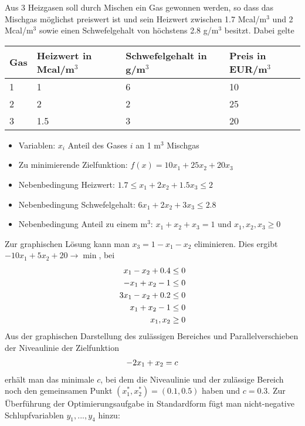 \setcounter{theorem}{0}
\begin{example}
	Aus 3 Heizgasen soll durch Mischen ein Gas gewonnen werden, so dass das Mischgas möglichst preiswert ist und sein Heizwert zwischen 1.7 Mcal/m$^3$ und 2 Mcal/m$^3$ sowie einen Schwefelgehalt von höchstens 2.8 g/m$^3$ besitzt. Dabei gelte
	\begin{center}
		\begin{tabular}{p{2.5cm}|p{2.5cm}|p{2.5cm}|p{2.5cm}}
			Gas & Heizwert in Mcal/m$^3$ & Schwefelgehalt in g/m$^3$ & Preis in EUR/m$^3$ \\
			\hline
			1 & 1 & 6 & 10 \\
			2 & 2 & 2 & 25 \\
			3 & 1.5 & 3 & 20\\
		\end{tabular}
	\end{center}
	\begin{itemize}
		\item Variablen: $x_i$ Anteil des Gases $i$ an 1 m$^3$ Mischgas
		\item Zu minimierende Zielfunktion: $f(x)=10x_1+25x_2+20x_3$
		\item Nebenbedingung Heizwert: $1.7\le x_1+2x_2+1.5x_3\le 2$
		\item Nebenbedingung Schwefelgehalt: $6x_1+2x_2+3x_3\le 2.8$
		\item Nebenbedingung Anteil zu einem m$^3$: $x_1+x_2+x_3=1$ und $x_1,x_2,x_3\ge 0$
	\end{itemize}
	Zur graphischen Lösung kann man $x_3=1-x_1-x_2$ eliminieren. Dies ergibt $-10x_1+5x_2+20\to\min$, bei
	\begin{align}
		x_1-x_2+0.4 &\le 0 \notag \\
		-x_1+x_2-1 &\le 0 \notag \\
		3x_1-x_2+0.2 &\le 0 \notag \\
		x_1+x_2-1 &\le 0\notag \\
		x_1,x_2 &\ge 0 \notag
	\end{align}
	Aus der graphischen Darstellung des zulässigen Bereiches und Parallelverschieben der Niveaulinie der Zielfunktion
	\begin{align}
		-2x_1+x_2 =c \notag
	\end{align}
	erhält man das minimale $c$, bei dem die Niveaulinie und der zulässige Bereich noch den gemeinsamen Punkt $(x_1^\ast,x_2^\ast)=(0.1,0.5)$ haben und $c=0.3$. Zur Überführung der Optimierungsaufgabe in Standardform fügt man nicht-negative Schlupfvariablen $y_1,...,y_4$ hinzu:
	\begin{align}

\end{align}
\end{example}

